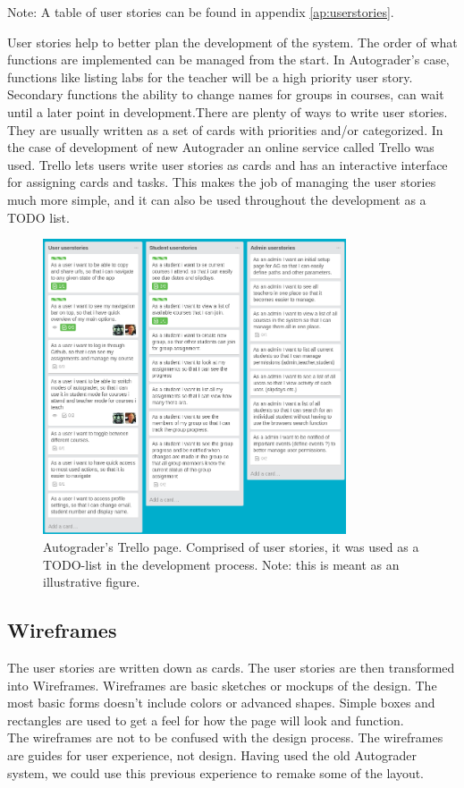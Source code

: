 Note: A table of user stories can be found in appendix \ref{ap:userstories}.

User stories help to better plan the development of the system. The order of what functions are implemented can be managed from the start. In Autograder's case, functions like listing labs for the teacher will be a high priority user story. Secondary functions the ability to change names for groups in courses, can wait until a later point in development.There are plenty of ways to write user stories. They are usually written as a set of cards with priorities and/or categorized. In the case of development of new Autograder an online service called Trello was used. Trello lets users write user stories as cards and has an interactive interface for assigning cards and tasks. This makes the job of managing the user stories much more simple, and it can also be used throughout the development as a TODO list.
\begin{figure}[h]
    \centering
    \includegraphics[width=0.8\textwidth]{./graphics/trello.png}
    \caption{Autograder's Trello page. Comprised of user stories, it was used as a TODO-list in the development process. Note: this is meant as an illustrative figure.}
    \label{fig:View of the trello page we used in the development process}
\end{figure}

\subsection{Wireframes}
The user stories are written down as cards. The user stories are then transformed into Wireframes. Wireframes are basic sketches or mockups of the design. The most basic forms doesn't include colors or advanced shapes. Simple boxes and rectangles are used to get a feel for how the page will look and function.
\\The wireframes are not to be confused with the design process. The wireframes are guides for user experience, not design. Having used the old Autograder system, we could use this previous experience to remake some of the layout. 

